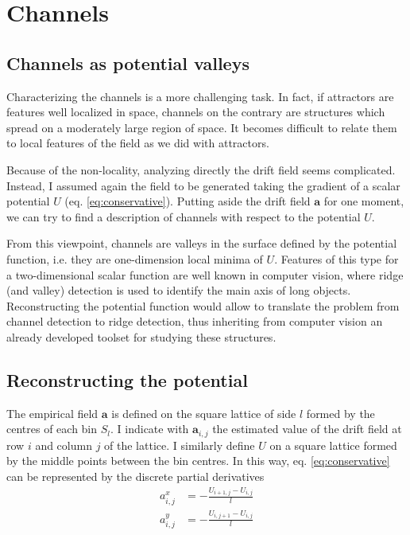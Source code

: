 \documentclass[a4paper]{article}
\begin{document}
\section{Channels}

\subsection{Channels as potential valleys}

Characterizing the channels is a more challenging task. In fact, if attractors are features well localized in space, channels on the contrary are structures which spread on a moderately large region of space. It becomes difficult to relate them to local features of the field as we did with attractors.

Because of the non-locality, analyzing directly the drift field seems complicated. Instead, I assumed again the field to be generated taking the gradient of a scalar potential $U$ (eq. \ref{eq:conservative}). Putting aside the drift field $\bm{a}$ for one moment, we can try to find a description of channels with respect to the potential $U$.

From this viewpoint, channels are valleys in the surface defined by the potential function, i.e. they are one-dimension local minima of $U$. Features of this type for a two-dimensional scalar function are well known in computer vision, where ridge (and valley) detection is used to identify the main axis of long objects. Reconstructing the potential function would allow to translate the problem from channel detection to ridge detection, thus inheriting from computer vision an already developed toolset for studying these structures.

\subsection{Reconstructing the potential}

The empirical field $\bm{a}$ is defined on the square lattice of side $l$ formed by the centres of each bin $S_l$. I indicate with $\bm{a}_{i,j}$ the estimated value of the drift field at row $i$ and column $j$ of the lattice. I similarly define $U$ on a square lattice formed by the middle points between the bin centres. In this way, eq. \ref{eq:conservative} can be represented by the discrete partial derivatives
\begin{align}
a^x_{i,j} &= - \frac{U_{i+1,j} - U_{i,j}}{l} \\[10pt]
a^y_{i,j} &= - \frac{U_{i,j+1} - U_{i,j}}{l}
\end{align}
\end{document}
